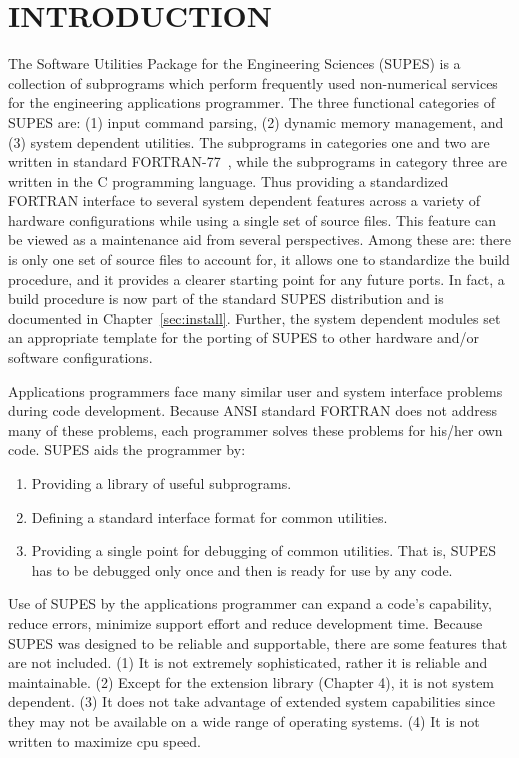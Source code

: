 \chapter{INTRODUCTION} 
The Software Utilities Package for the Engineering
Sciences (SUPES) is a collection of subprograms which perform frequently
used non-numerical services for the engineering applications programmer.
The
three functional categories of SUPES are: (1) input command parsing, (2) dynamic
memory management, and (3) system dependent utilities.  The subprograms in
categories one and two are written in standard FORTRAN-77~\cite{ansi},
while the subprograms
in category three are written in the C programming language.
Thus providing a standardized FORTRAN interface to
several system dependent features across a variety of hardware configurations
while using a single set of source files.
This feature can be viewed as a maintenance aid from
several perspectives.
Among these are:
there is only one set of source files to account for,
it allows one to standardize the build procedure,
and it provides a clearer starting point for any future ports.
In fact,
a build procedure is now part of the standard SUPES distribution and
is documented in Chapter~\ref{sec:install}.
Further,
the system dependent modules set an appropriate template for the
porting of SUPES to other hardware and/or software configurations.

Applications programmers face many similar user and system interface problems
during code development.  Because ANSI standard FORTRAN does not address many of
these problems, each programmer solves these problems for his/her own code.
SUPES aids the programmer by: 
\begin{enumerate} 

\item Providing a library of useful subprograms.

\item Defining a standard interface format for common utilities.

\item Providing a single point for debugging of common utilities.  That
is, SUPES has to be debugged only once and then is ready for use
by any code.
\end{enumerate}

Use of SUPES by the applications programmer can expand a code's capability,
reduce errors, minimize support effort and reduce development time.  Because
SUPES was designed to be reliable and supportable, there are some features
that are not included.  (1) It is not extremely sophisticated, rather it is
reliable and maintainable.  (2) Except for the extension library (Chapter
4), it is not system dependent.  (3) It does not take advantage of extended
system capabilities since they may not be available on a wide range of
operating systems.  (4) It is not written to maximize cpu speed.

